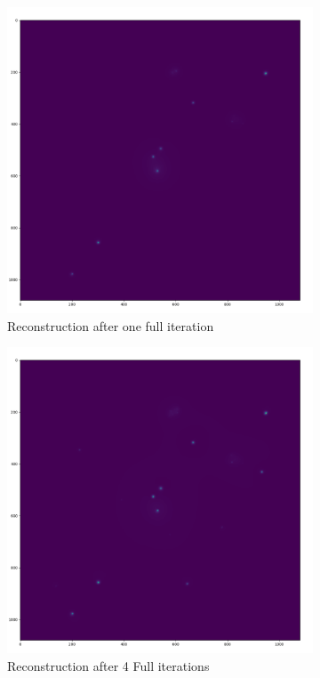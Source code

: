 \begin{figure}[h]
	\centering
	\begin{subfigure}[b]{0.45\linewidth}
		\includegraphics[width=\linewidth]{./chapters/05.algorithms/results/image.png}
		\caption{Reconstruction after one full iteration}
		\label{results:g55:nrao:rec}
	\end{subfigure}
	\begin{subfigure}[b]{0.45\linewidth}
		\includegraphics[width=\linewidth]{./chapters/05.algorithms/results/image4.png}
		\caption{Reconstruction after 4 Full iterations}
		\label{results:g55:nrao:dirty}
	\end{subfigure}
	\caption{}
	\label{results:g55:nrao}
\end{figure}

